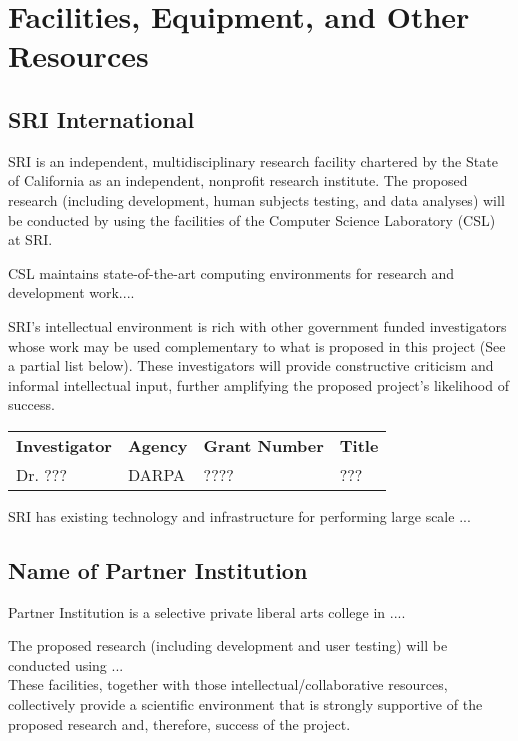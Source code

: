 
\section*{Facilities, Equipment, and Other Resources}

\subsection*{SRI International}
SRI is an independent, multidisciplinary research facility chartered by the State of
California as an independent, nonprofit research institute. The proposed research
(including development, human subjects testing, and data analyses) will be conducted by
using the facilities of the Computer Science Laboratory (CSL) at SRI.

CSL maintains state-of-the-art computing environments for research and development work....

SRI's intellectual environment is rich with other government funded investigators whose
work may be used complementary to what is proposed in this project (See a partial list
below). These investigators will provide constructive criticism and informal intellectual
input, further amplifying the proposed project's likelihood of success.

\begin{table}[h!]
\centering
\small
\label{lbl:investigators}
\begin{tabular}{lllp{5cm}}
\textbf{Investigator} & \textbf{Agency} & \textbf{Grant Number} & \textbf{Title} \\
Dr. ??? & DARPA           & ????                   & ???           \\
\end{tabular}
\end{table}

SRI has existing technology and infrastructure for performing large scale ...

\subsection*{Name of Partner Institution}
Partner Institution is a selective private liberal arts college in ....

The proposed research (including development and user testing) will be conducted using ...
\\

These facilities, together with those intellectual/collaborative resources, collectively provide a
scientific environment that is strongly supportive of the proposed research and, therefore, success
of the project.